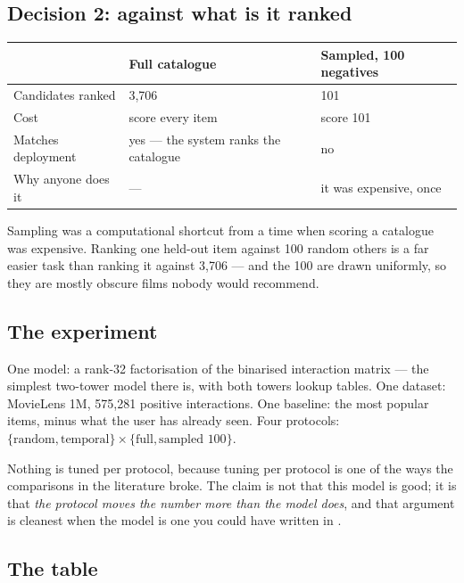 \documentclass[11pt,a4paper]{article}
\begin{document}
\subsection{Decision 2: against what is it ranked}

\begin{center}
\small
\begin{tabular}{p{}p{}p{}}
\toprule
 & \textbf{Full catalogue} & \textbf{Sampled, 100 negatives} \\
\midrule
Candidates ranked  & 3{,}706 & 101 \\
Cost               & score every item & score 101 \\
Matches deployment & yes --- the system ranks the catalogue & no \\
Why anyone does it & --- & it was expensive, once \\
\bottomrule
\end{tabular}
\end{center}

Sampling was a computational shortcut from a time when scoring a catalogue was
expensive. Ranking one held-out item against 100 random others is a far easier
task than ranking it against 3{,}706 --- and the 100 are drawn uniformly, so
they are mostly obscure films nobody would recommend.

\subsection{The experiment}

One model: a rank-32 factorisation of the binarised interaction matrix --- the
simplest two-tower model there is, with both towers lookup tables. One dataset:
MovieLens 1M, 575{,}281 positive interactions. One baseline: the most popular
items, minus what the user has already seen. Four protocols:
$\{\text{random}, \text{temporal}\} \times \{\text{full}, \text{sampled }100\}$.

Nothing is tuned per protocol, because tuning per protocol is one of the ways
the comparisons in the literature broke. The claim is not that this model is
good; it is that \emph{the protocol moves the number more than the model does},
and that argument is cleanest when the model is one you could have written in
.

\subsection{The table}
\end{document}
